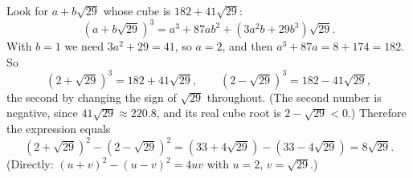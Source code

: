 Look for $a+b\sqrt{29}$ whose cube is $182+41\sqrt{29}$:
\[
\left(a+b\sqrt{29}\right)^3=a^3+87ab^2+\left(3a^2b+29b^3\right)\sqrt{29}.
\]
With $b=1$ we need $3a^2+29=41$, so $a=2$, and then $a^3+87a=8+174=182$. So
\[
\left(2+\sqrt{29}\right)^3=182+41\sqrt{29},\qquad \left(2-\sqrt{29}\right)^3=182-41\sqrt{29},
\]
the second by changing the sign of $\sqrt{29}$ throughout. (The second number is negative, since $41\sqrt{29}\approx220.8$, and its real cube root is $2-\sqrt{29}<0$.) Therefore the expression equals
\[
\left(2+\sqrt{29}\right)^2-\left(2-\sqrt{29}\right)^2=\left(33+4\sqrt{29}\right)-\left(33-4\sqrt{29}\right)=\boxed{8\sqrt{29}} .
\]
(Directly: $(u+v)^2-(u-v)^2=4uv$ with $u=2$, $v=\sqrt{29}$.)
